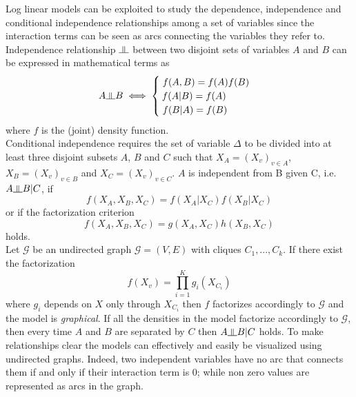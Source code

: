 \documentclass{article}
\newcommand{\indep}{\rotatebox[origin=c]{90}{$\models$}}
\begin{document}
Log linear models can be exploited to study the dependence, independence and conditional independence relationships among a set of variables since the interaction terms can be seen as arcs connecting the variables they refer to. \\
Independence relationship $\indep$  between two disjoint sets of variables $A$ and $B$ can be expressed in mathematical terms as 
\begin{equation}
    A \indep B  \iff
        \begin{cases}
        \; f(A,B)=f(A)f(B) \\
        \: f(A|B) = f(A) \\
        \; f(B|A) = f(B)\\
        \end{cases}
\end{equation}
where $f$ is the (joint) density function. \\

Conditional independence requires the set of variable $\Delta$ to be divided into at least three disjoint subsets $A$, $B$ and $C$ such that
$X_A=(X_v)_{v \in A}$, $X_B=(X_v)_{ v \in B}$ and $X_C=(X_v)_{ v \in C}$.
$A$ is independent from B given C, i.e. $A \indep B | C$, if 
\begin{equation}
    f(X_A,X_B,X_C) = f(X_A|X_C)f(X_B|X_C)
\end{equation}
or if the factorization criterion
\begin{equation}
    f(X_A,X_B,X_C) = g(X_A,X_C)h(X_B,X_C)
\end{equation} holds. \\

Let $\mathcal{G}$ be an undirected graph $\mathcal{G} = (V,E) $ with cliques $C_1,...,C_k$. If  there exist the factorization
\begin{equation}
    f(X_v) =  \prod\limits_{i=1}^{K}g_i(X_{C_i})
\end{equation} where $g_i$ depends on $X$ only through $X_{C_i}$ then $f$ factorizes accordingly to $\mathcal{G}$ and the model is \textit{graphical}.
If all the densities in the model factorize accordingly to $\mathcal{G}$, then every time $A$ and $B$ are separated by $C$ then $A \indep B | C$ holds.
To make relationships clear the models can effectively and easily be visualized using undirected graphs. Indeed, two independent variables have no arc that connects them if and only if their interaction term is 0; while non zero values are represented as arcs in the graph. \\
\end{document}
